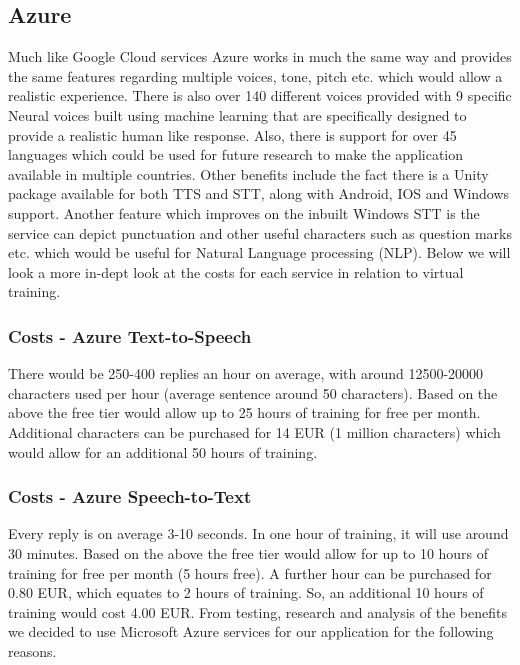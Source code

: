 \subsection{Azure}
Much like Google Cloud services Azure works in much the same way and provides the same features regarding multiple voices, tone, pitch etc. which would allow a realistic experience. There is also over 140 different voices provided with 9 specific Neural voices built using machine learning that are specifically designed to provide a realistic human like response. Also, there is support for over 45 languages which could be used for future research to make the application available in multiple countries. Other benefits include the fact there is a Unity package available for both TTS and STT, along with Android, IOS and Windows support. Another feature which improves on the inbuilt Windows STT is the service can depict punctuation and other useful characters such as question marks etc. which would be useful for Natural Language processing (NLP). Below we will look a more in-dept look at the costs for each service in relation to virtual training.

\subsubsection{Costs - Azure Text-to-Speech}
There would be 250-400 replies an hour on average, with around 12500-20000 characters used per hour (average sentence around 50 characters). Based on the above the free tier would allow up to 25 hours of training for free per month. Additional characters can be purchased for 14 EUR (1 million characters) which would allow for an additional 50 hours of training.

\subsubsection{Costs - Azure Speech-to-Text}
Every reply is on average 3-10 seconds. In one hour of training, it will use around 30 minutes. Based on the above the free tier would allow for up to 10 hours of training for free per month (5 hours free). A further hour can be purchased for 0.80 EUR, which equates to 2 hours of training. So, an additional 10 hours of training would cost 4.00 EUR.
\newline\newline
From testing, research and analysis of the benefits we decided to use Microsoft Azure services for our application for the following reasons.

